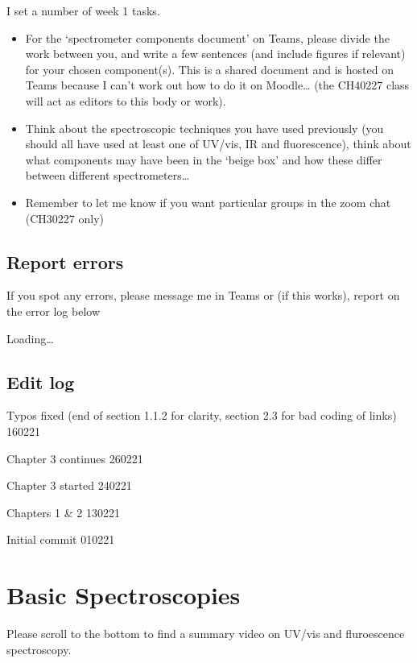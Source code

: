 \documentclass[
]{book}
\begin{document}
I set a number of week 1 tasks.

\begin{itemize}
\item
  For the `spectrometer components document' on Teams, please divide the work between you, and write a few sentences (and include figures if relevant) for your chosen component(s). This is a shared document and is hosted on Teams because I can't work out how to do it on Moodle\ldots{} (the CH40227 class will act as editors to this body or work).
\item
  Think about the spectroscopic techniques you have used previously (you should all have used at least one of UV/vis, IR and fluorescence), think about what components may have been in the `beige box' and how these differ between different spectrometers\ldots{}
\item
  Remember to let me know if you want particular groups in the zoom chat (CH30227 only)
\end{itemize}

\hypertarget{report-errors}{%
\section*{Report errors}\label{report-errors}}

If you spot any errors, please message me in Teams or (if this works), report on the error log below

Loading\ldots{}

\hypertarget{edit-log}{%
\section*{Edit log}\label{edit-log}}

Typos fixed (end of section 1.1.2 for clarity, section 2.3 for bad coding of links) 160221

Chapter 3 continues 260221

Chapter 3 started 240221

Chapters 1 \& 2 130221

Initial commit 010221

\hypertarget{ch:UVvisfluorIR}{%
\chapter{Basic Spectroscopies}\label{ch:UVvisfluorIR}}

Please scroll to the bottom to find a summary video on UV/vis and fluroescence spectroscopy.
\end{document}
